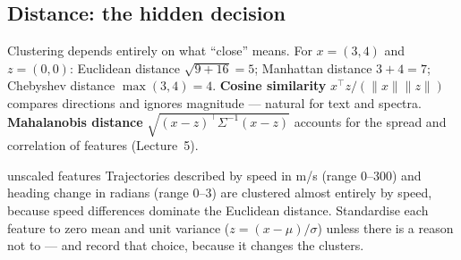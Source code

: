 \documentclass[11pt]{article}
\begin{document}
\subsection{Distance: the hidden decision}
Clustering depends entirely on what ``close'' means. For $x=(3,4)$ and $z=(0,0)$: Euclidean distance $\sqrt{9+16}=5$; Manhattan distance $3+4=7$; Chebyshev distance $\max(3,4)=4$. \textbf{Cosine similarity} $x^\top z/(\|x\|\|z\|)$ compares directions and ignores magnitude --- natural for text and spectra. \textbf{Mahalanobis distance} $\sqrt{(x-z)^\top\Sigma^{-1}(x-z)}$ accounts for the spread and correlation of features (Lecture~5).
\begin{pitfall}{unscaled features}
Trajectories described by speed in m/s (range 0--300) and heading change in radians (range 0--3) are clustered almost entirely by speed, because speed differences dominate the Euclidean distance. Standardise each feature to zero mean and unit variance ($z=(x-\mu)/\sigma$) unless there is a reason not to --- and record that choice, because it changes the clusters.
\end{pitfall}
\end{document}
